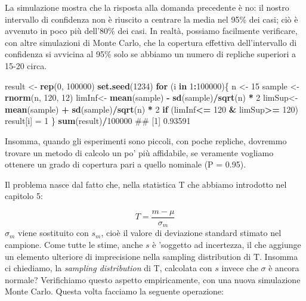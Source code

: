 \documentclass[a4paper,12pt,oneside]{book}
\newenvironment{Shaded}{\begin{snugshade}}{\end{snugshade}}
\newcommand{\KeywordTok}[1]{\textcolor[rgb]{0.13,0.29,0.53}{\textbf{#1}}}
\newcommand{\DecValTok}[1]{\textcolor[rgb]{0.00,0.00,0.81}{#1}}
\newcommand{\StringTok}[1]{\textcolor[rgb]{0.31,0.60,0.02}{#1}}
\newcommand{\ControlFlowTok}[1]{\textcolor[rgb]{0.13,0.29,0.53}{\textbf{#1}}}
\newcommand{\OperatorTok}[1]{\textcolor[rgb]{0.81,0.36,0.00}{\textbf{#1}}}
\newcommand{\NormalTok}[1]{#1}
\theoremstyle{definition}
\theoremstyle{definition}
\theoremstyle{definition}
\theoremstyle{remark}
\begin{document}
La simulazione mostra che la risposta alla domanda precedente è no: il
nostro intervallo di confidenza non è riuscito a centrare la media nel
95\% dei casi; ciò è avvenuto in poco più dell'80\% dei casi. In realtà,
possiamo facilmente verificare, con altre simulazioni di Monte Carlo,
che la copertura effettiva dell'intervallo di confidenza si avvicina al
95\% solo se abbiamo un numero di repliche superiori a 15-20 circa.

\begin{Shaded}
\begin{Highlighting}[]
\NormalTok{result <-}\StringTok{ }\KeywordTok{rep}\NormalTok{(}\DecValTok{0}\NormalTok{, }\DecValTok{100000}\NormalTok{)}
\KeywordTok{set.seed}\NormalTok{(}\DecValTok{1234}\NormalTok{)}
\ControlFlowTok{for}\NormalTok{ (i }\ControlFlowTok{in} \DecValTok{1}\OperatorTok{:}\DecValTok{100000}\NormalTok{)\{}
\NormalTok{  n <-}\StringTok{ }\DecValTok{15}
\NormalTok{  sample <-}\StringTok{ }\KeywordTok{rnorm}\NormalTok{(n, }\DecValTok{120}\NormalTok{, }\DecValTok{12}\NormalTok{)}
\NormalTok{  limInf<-}\StringTok{ }\KeywordTok{mean}\NormalTok{(sample) }\OperatorTok{-}\StringTok{ }\KeywordTok{sd}\NormalTok{(sample)}\OperatorTok{/}\KeywordTok{sqrt}\NormalTok{(n) }\OperatorTok{*}\StringTok{ }\DecValTok{2} 
\NormalTok{  limSup<-}\StringTok{ }\KeywordTok{mean}\NormalTok{(sample) }\OperatorTok{+}\StringTok{ }\KeywordTok{sd}\NormalTok{(sample)}\OperatorTok{/}\KeywordTok{sqrt}\NormalTok{(n) }\OperatorTok{*}\StringTok{ }\DecValTok{2}
  \ControlFlowTok{if}\NormalTok{ (limInf}\OperatorTok{<=}\StringTok{ }\DecValTok{120} \OperatorTok{&}\StringTok{ }\NormalTok{limSup}\OperatorTok{>=}\StringTok{ }\DecValTok{120}\NormalTok{) result[i] =}\StringTok{ }\DecValTok{1}
\NormalTok{\}}
\KeywordTok{sum}\NormalTok{(result)}\OperatorTok{/}\DecValTok{100000}
\NormalTok{## [1] 0.93591}
\end{Highlighting}
\end{Shaded}

Insomma, quando gli esperimenti sono piccoli, con poche repliche,
dovremmo trovare un metodo di calcolo un po' più affidabile, se
veramente vogliamo ottenere un grado di copertura pari a quello nominale
(P = 0.95).

Il problema nasce dal fatto che, nella statistica T che abbiamo
introdotto nel capitolo 5:

\[T = \frac{m - \mu}{\sigma_m}\] \(\sigma_m\) viene sostituito con
\(s_m\), cioè il valore di deviazione standard stimato nel campione.
Come tutte le stime, anche \(s\) è 'soggetto ad incertezza, il che
aggiunge un elemento ulteriore di imprecisione nella sampling
distribution di T. Insomma ci chiediamo, la \emph{sampling distribution}
di T, calcolata con \(s\) invece che \(\sigma\) è ancora normale?
Verifichiamo questo aspetto empiricamente, con una nuova simulazione
Monte Carlo. Questa volta facciamo la seguente operazione:
\end{document}

